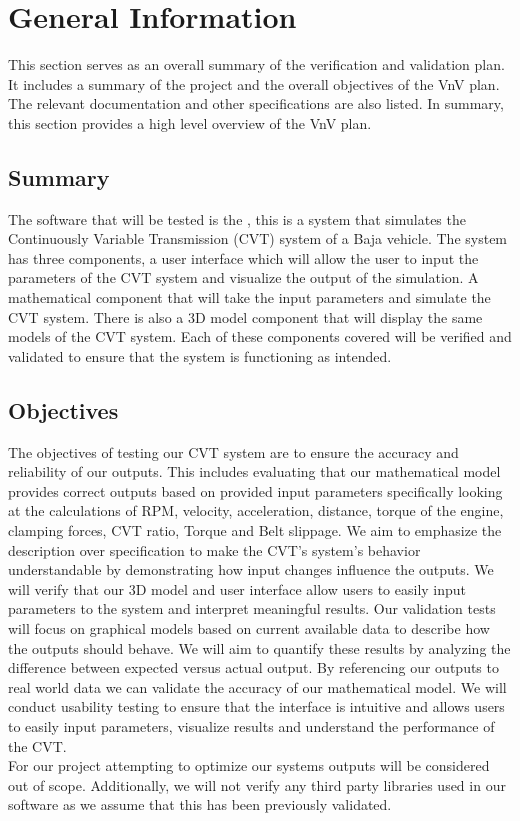 \documentclass[12pt, titlepage]{article}
\begin{document}
\section{General Information}

This section serves as an overall summary of the verification and validation plan.
It includes a summary of the project and the overall objectives of the VnV plan.
The relevant documentation and other specifications are also listed.
In summary, this section provides a high level overview of the VnV plan.

\subsection{Summary}

The software that will be tested is the \progname{}, this is a system that simulates the Continuously Variable Transmission (CVT) system of a Baja vehicle.
The system has three components, a user interface which will allow the user to input the parameters of the CVT system and visualize the output of the simulation.
A mathematical component that will take the input parameters and simulate the CVT system.
There is also a 3D model component that will display the same models of the CVT system. 
Each of these components covered will be verified and validated to ensure that the system is functioning as intended.

\subsection{Objectives}

\noindent The objectives of testing our CVT system are to ensure the accuracy and reliability of our outputs. 
This includes evaluating that our mathematical model provides correct outputs based on provided input parameters specifically looking at the calculations of RPM, velocity, acceleration, distance, torque of the engine, clamping forces, CVT ratio, Torque and Belt slippage. 
We aim to emphasize the description over specification to make the CVT's system's behavior understandable by demonstrating how input changes influence the outputs.
We will verify that our 3D model and user interface allow users to easily input parameters to the system and interpret meaningful results. 
Our validation tests will focus on graphical models based on current available data to describe how the outputs should behave. 
We will aim to quantify these results by analyzing the difference between expected versus actual output. 
By referencing our outputs to real world data we can validate the accuracy of our mathematical model.
We will conduct usability testing to ensure that the interface is intuitive and allows users to easily input parameters, visualize results and understand the performance of the CVT.
\\
\noindent For our project attempting to optimize our systems outputs will be considered out of scope. 
Additionally, we will not verify any third party libraries used in our software as we assume that this has been previously validated. 
\end{document}

